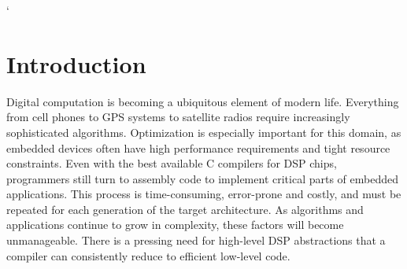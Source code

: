 `%
 

\section{Introduction}
Digital computation is becoming a ubiquitous element of
modern life.  Everything from cell phones to GPS systems to satellite
radios require increasingly sophisticated algorithms.  Optimization is
especially important for this domain, as embedded devices often have
high performance requirements and tight resource constraints.  Even
with the best available C compilers for DSP chips, programmers still
turn to assembly code to implement critical parts of embedded
applications.  This process is time-consuming, error-prone and
costly, and must be repeated for each generation of the target
architecture.  As algorithms and applications continue to grow in
complexity, these factors will become unmanageable.  There is a
pressing need for high-level DSP abstractions that a compiler can
consistently reduce to efficient low-level code.

